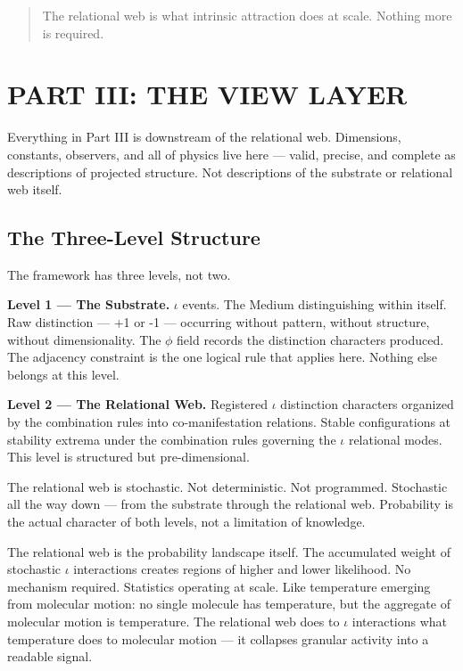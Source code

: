 \documentclass[11pt,letterpaper]{article}
\begin{document}
\begin{quote}
The relational web is what intrinsic attraction does at scale. Nothing more is required.
\end{quote}

\section{PART III: THE VIEW LAYER}
\label{sec:org9b882ca}

Everything in Part III is downstream of the relational web. Dimensions, constants, observers, and all of physics live here --- valid, precise, and complete as descriptions of projected structure. Not descriptions of the substrate or relational web itself.

\subsection{The Three-Level Structure}
\label{sec:org7832fda}

The framework has three levels, not two.

\textbf{Level 1 --- The Substrate.} \(\iota\) events. The Medium distinguishing within itself. Raw distinction --- +1 or -1 --- occurring without pattern, without structure, without dimensionality. The \(\phi\) field records the distinction characters produced. The adjacency constraint is the one logical rule that applies here. Nothing else belongs at this level.

\textbf{Level 2 --- The Relational Web.} Registered \(\iota\) distinction characters organized by the combination rules into co-manifestation relations. Stable configurations at stability extrema under the combination rules governing the \(\iota\) relational modes. This level is structured but pre-dimensional.

The relational web is stochastic. Not deterministic. Not programmed. Stochastic all the way down --- from the substrate through the relational web. Probability is the actual character of both levels, not a limitation of knowledge.

The relational web is the probability landscape itself. The accumulated weight of stochastic \(\iota\) interactions creates regions of higher and lower likelihood. No mechanism required. Statistics operating at scale. Like temperature emerging from molecular motion: no single molecule has temperature, but the aggregate of molecular motion is temperature. The relational web does to \(\iota\) interactions what temperature does to molecular motion --- it collapses granular activity into a readable signal.
\end{document}
